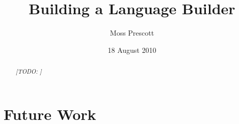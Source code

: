 \documentclass[12pt]{amsart}
\title{Building a Language Builder}
\author{Moss Prescott}
\date{18 August 2010}
\newcommand{\todo}[1]{ {\textit{\color{red}[TODO: #1]}} }
\begin{document}
\begin{abstract}
\todo{}
\end{abstract}

\maketitle


\tableofcontents

\newpage




%
%
%
%


\section{Future Work}

\end{document}

